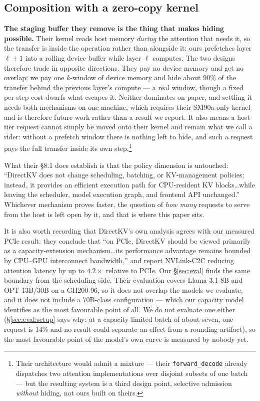 \subsection*{Composition with a zero-copy kernel}

\textbf{The staging buffer they remove is the thing that makes hiding
possible.} Their kernel reads host memory \emph{during} the attention that
needs it, so the transfer is inside the operation rather than alongside it;
ours prefetches layer $\ell{+}1$ into a rolling device buffer while layer
$\ell$ computes. The two designs therefore trade in opposite directions. They
pay no device memory and get no overlap; we pay one $k$-window of device memory
and hide about $90\%$ of the transfer behind the previous layer's compute ---
a real window, though a fixed per-step cost dwarfs what escapes it. Neither dominates on paper, and
settling it needs both mechanisms on one machine, which requires their
SM90a-only kernel and is therefore future work rather than a result we report. It also means a host-tier
request cannot simply be moved onto their kernel and remain what we call a
rider: without a prefetch window there is nothing left to hide, and such a
request pays the full transfer inside its own step.\footnote{Their architecture
would admit a mixture --- their \texttt{forward\_decode} already dispatches two
attention implementations over disjoint subsets of one batch --- but the
resulting system is a third design point, selective admission \emph{without}
hiding, not ours built on theirs.}

What their \S8.1 does establish is that the policy dimension is untouched:
``DirectKV does not change scheduling, batching, or KV-management policies;
instead, it provides an efficient execution path for CPU-resident KV
blocks\ldots while leaving the scheduler, model execution graph, and frontend
API unchanged.'' Whichever mechanism proves faster, the question of \emph{how
many} requests to serve from the host is left open by it, and that is where
this paper sits.

It is also worth recording that DirectKV's own analysis agrees with our
measured PCIe result: they conclude that ``on PCIe, DirectKV should be viewed
primarily as a capacity-extension mechanism\ldots its performance advantage
remains bounded by CPU--GPU interconnect bandwidth,'' and report NVLink-C2C
reducing attention latency by up to $4.2\times$ relative to PCIe. Our
\S\ref{sec:eval} finds the same boundary from the scheduling side. Their
evaluation covers Llama-3.1-8B and OPT-13B/30B on a GH200-96, so it does not
overlap the models we evaluate, and it does not include a 70B-class
configuration --- which our capacity model identifies as the most favourable
point of all. We do not evaluate one either (\S\ref{sec:eval:setup} says why: at
a capacity-limited batch of about seven, one request is 14\% and no result could
separate an effect from a rounding artifact), so the most favourable point of
the model's own curve is measured by nobody yet.


